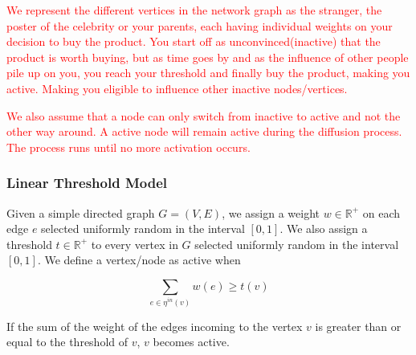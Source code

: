 \textcolor{red}{
We represent the different vertices in the network graph as the stranger, the poster of the celebrity or your parents, each having individual weights on your decision to buy the product. You start off as unconvinced(inactive) that the product is worth buying, but as time goes by and as the influence of other people pile up on you, you reach your threshold and finally buy the product, making you active. Making you eligible to influence other inactive nodes/vertices.}

\textcolor{red}{
We also assume that a node can only switch from inactive to active and not the other way around. A active node will remain active during the diffusion process. The process runs until no more activation occurs.\cite{Shakarian:2012:LSN:2456719.2457081} }
\subsubsection{Linear Threshold Model}
Given a simple directed graph $G=(V,E)$, we assign a weight $w\in \mathbb{R}^{+}$ on each edge $e$ selected uniformly random in the interval $[0,1]$. We also assign a threshold $t \in \mathbb{R}^{+}$ to every vertex in $G$ selected uniformly random in the interval $[0,1]$.
We define a vertex/node as active when

		$$\sum_{e \in \eta^{in}(v)} w(e)\geq t(v)$$

If the sum of the weight of the edges incoming to the vertex $v$ is greater than or equal to the threshold of $v$, $v$ becomes active.

